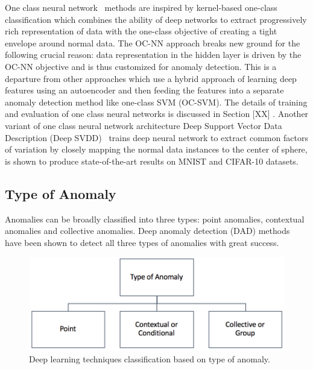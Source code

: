 One class neural network~\cite{chalapathy2018anomaly} methods are inspired by kernel-based one-class classification which combines the ability of deep networks to extract progressively rich representation of data with the one-class objective of creating a tight envelope around normal data. The OC-NN approach breaks new ground for the following crucial reason: data representation in the hidden layer is driven by the OC-NN objective and is thus customized for anomaly detection. This is a departure from other approaches which use a hybrid approach of learning deep features using an autoencoder and then feeding the features into a separate anomaly detection method like one-class SVM (OC-SVM).  The details of training and evaluation of one class neural networks is discussed in Section [XX] . Another variant of one class neural network architecture Deep Support Vector Data Description (Deep SVDD)~\cite{ruff2018deep} trains deep neural network to extract common factors of variation by closely mapping the normal data instances to the center of sphere, is shown to produce state-of-the-art results on MNIST and CIFAR-10 datasets.



\vspace{0.6cm}
\subsection{Type of Anomaly}
\label{sec:typeBasedAD}
Anomalies can be broadly  classified into three types: point anomalies, contextual anomalies and collective anomalies. Deep anomaly detection (DAD) methods have been shown to detect all three types of anomalies with great success.

\begin{figure}[h]
\includegraphics[scale=0.5]{images/TypeOfAnomaly}
\captionsetup{justification=centering}
\caption{Deep learning techniques classification based on type of anomaly.}
\label{fig:typeOfAnomaly}
\end{figure}


